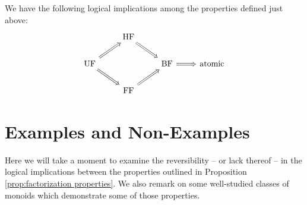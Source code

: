 \begin{prop} \label{prop:factorization properties}
We have the following logical implications among the properties defined just above:
\[\begin{tikzcd}[arrows = Rightarrow]
 & \text{HF} \arrow{dr}&  &  \\
\text{UF} \arrow{ur}\arrow{dr}  &  & \text{BF} \arrow{r}& \text{atomic} \\
 & \text{FF} \arrow{ur} &  & 
\end{tikzcd}\]
\end{prop}



\section{Examples and Non-Examples} \label{sec:examples}
Here we will take a moment to examine the reversibility -- or lack thereof -- in the logical implications between the properties outlined in Proposition \ref{prop:factorization properties}.
We also remark on some well-studied classes of monoids which demonstrate some of those properties.

